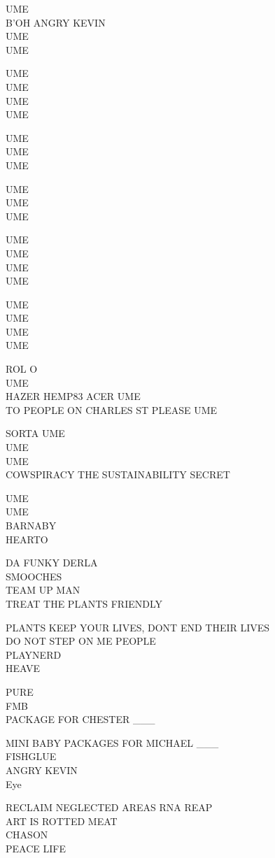 \documentclass[10pt,letterpaper]{article}
\begin{document}
UME\\
B'OH ANGRY KEVIN\\
UME\\
UME

UME\\
UME\\
UME\\
UME

UME\\
UME\\
UME

UME\\
UME\\
UME

UME\\
UME\\
UME\\
UME

UME\\
UME\\
UME\\
UME

ROL O\\
UME\\
HAZER HEMP83 ACER UME\\
TO PEOPLE ON CHARLES ST PLEASE UME

SORTA UME\\
UME\\
UME\\
COWSPIRACY THE SUSTAINABILITY SECRET

UME\\
UME\\
BARNABY\\
HEARTO

DA FUNKY DERLA\\
SMOOCHES\\
TEAM UP MAN\\
TREAT THE PLANTS FRIENDLY

PLANTS KEEP YOUR LIVES, DONT END THEIR LIVES\\
DO NOT STEP ON ME PEOPLE\\
PLAYNERD\\
HEAVE

PURE\\
FMB\\
PACKAGE FOR CHESTER \_\_\_

MINI BABY PACKAGES FOR MICHAEL \_\_\_\\
FISHGLUE\\
ANGRY KEVIN\\
Eye

RECLAIM NEGLECTED AREAS RNA REAP\\
ART IS ROTTED MEAT\\
CHASON\\
PEACE LIFE
\end{document}
